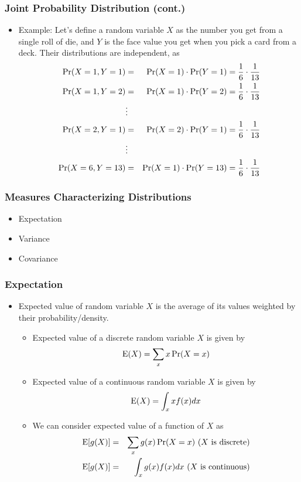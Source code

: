 \documentclass[pdflatex, 12pt]{beamer}
\begin{document}
\begin{frame}
\frametitle{Joint Probability Distribution (cont.)}
\begin{itemize}
\item Example: Let's define a random variable $X$ as the number you get from a single roll of die, and $Y$ is the face value you get when you pick a card from a deck. Their distributions are independent, as
 \begin{eqnarray}  
 \Pr(X = 1, Y = 1) &=& \Pr(X = 1)\cdot \Pr(Y = 1) = \frac{1}{6}\cdot \frac{1}{13} \notag \\
 \Pr(X = 1, Y = 2) &=& \Pr(X = 1)\cdot \Pr(Y = 2) = \frac{1}{6}\cdot \frac{1}{13} \notag \\
 &\vdots& \notag \\
 \Pr(X = 2, Y = 1) &=& \Pr(X = 2)\cdot \Pr(Y = 1) = \frac{1}{6}\cdot \frac{1}{13} \notag \\
 &\vdots& \notag \\
 \Pr(X = 6, Y = 13) &=& \Pr(X = 1)\cdot \Pr(Y = 13) = \frac{1}{6}\cdot \frac{1}{13} \notag 
 \end{eqnarray}
\end{itemize}
\end{frame}

\begin{frame}
\frametitle{Measures Characterizing Distributions}
\begin{itemize}
\item Expectation
\vspace{0.4cm}
\item Variance
\vspace{0.4cm}
\item Covariance
\end{itemize}
\end{frame}

\begin{frame}
\frametitle{Expectation}
\begin{itemize}
\item Expected value of random variable $X$ is the average of its values weighted by their probability/density.
 \begin{itemize}
 \item Expected value of a discrete random variable $X$ is given by 
  \begin{equation}
  \mathrm{E}(X) = \sum_{x} x \Pr(X = x) \notag
  \end{equation}
 \item Expected value of a continuous random variable $X$ is given by
  \begin{equation}
  \mathrm{E}(X) = \int_{x} x f(x) dx \notag
  \end{equation}
 \item We can consider expected value of a function of $X$ as 
  \begin{eqnarray}
  \mathrm{E}[g(X)] &=& \sum_{x} g(x) \Pr(X = x) \ (X \ \mathrm{is \ discrete}) \notag \\
  \mathrm{E}[g(X)] &=& \int_{x} g(x) f(x) dx \ (X \ \mathrm{is \ continuous}) \notag
  \end{eqnarray}
 \end{itemize}  
\end{itemize}
\end{frame}
\end{document}
